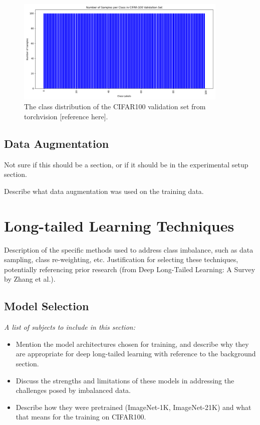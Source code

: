 \begin{figure}[H]
    \centering
    \includegraphics[width=0.9\textwidth]{Images/Plots/cifar100_val_class_distribution.png}
    \caption{The class distribution of the CIFAR100 validation set from torchvision [reference here].}
    \label{fig:cifar100val}
\end{figure}

\subsection{Data Augmentation}
Not sure if this should be a section, or if it should be in the experimental setup section.

Describe what data augmentation was used on the training data.

\section{Long-tailed Learning Techniques}
Description of the specific methods used to address class imbalance, such as data sampling, class re-weighting, etc. 
Justification for selecting these techniques, potentially referencing prior research (from Deep Long-Tailed Learning: A Survey by Zhang et al.).

\subsection{Model Selection}
\textit{A list of subjects to include in this section:}

\begin{itemize}
    \item Mention the model architectures chosen for training, and describe why they are appropriate for deep long-tailed learning with reference to the background section.
    \item Discuss the strengths and limitations of these models in addressing the challenges posed by imbalanced data.
    \item Describe how they were pretrained (ImageNet-1K, ImageNet-21K) and what that means for the training on CIFAR100.
\end{itemize}



